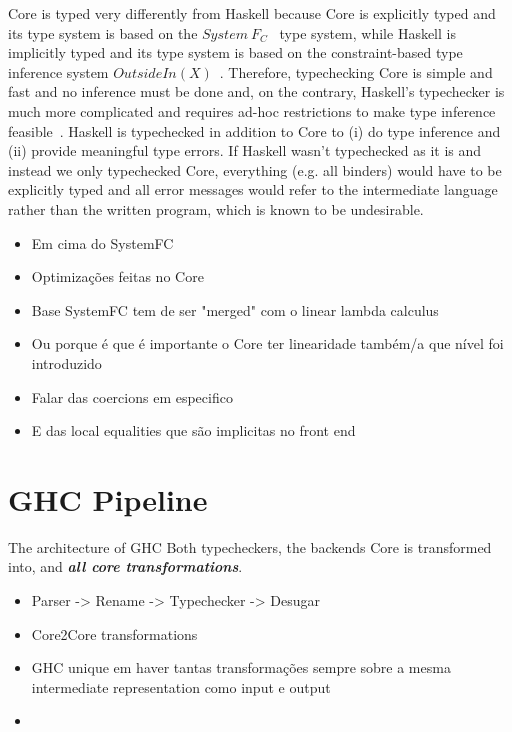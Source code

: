 \documentclass[]{lwnovathesis}
\begin{document}
Core is typed very differently from Haskell because Core is explicitly typed and
its type system is based on the $System~F_C$~\cite{systemfc} type system, while
Haskell is implicitly typed and its type system is based on the constraint-based
type inference system $OutsideIn(X)$~\cite{outsideinx}. Therefore, typechecking
Core is simple and fast and no inference must be done and, on the contrary,
Haskell's typechecker is much more complicated and requires ad-hoc restrictions
to make type inference feasible~\cite{}.
%
Haskell is typechecked in addition to Core to (i) do type inference and (ii)
provide meaningful type errors. If Haskell wasn't typechecked as it is and
instead we only typechecked Core, everything (e.g.  all binders) would have to
be explicitly typed and all error messages would refer to the intermediate
language rather than the written program, which is known to be undesirable.


\begin{itemize}
    \item Em cima do SystemFC
    \item Optimizações feitas no Core
    \item Base SystemFC tem de ser "merged" com o linear lambda calculus
    \item Ou porque é que é importante o Core ter linearidade também/a que nível
        foi introduzido
    \item Falar das coercions em especifico
    \item E das local equalities que são implicitas no front end
\end{itemize}

\section{GHC Pipeline}

The architecture of GHC
Both typecheckers, the backends Core is transformed into, and \textbf{\emph{all
core transformations}}.

\begin{itemize}
    \item Parser -> Rename -> Typechecker -> Desugar
    \item Core2Core transformations
    \item GHC unique em haver tantas transformações sempre sobre a mesma intermediate
        representation como input e output
    \item 
\end{itemize}
\end{document}
